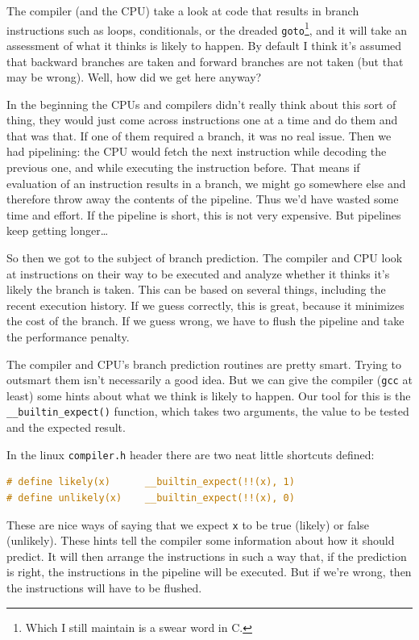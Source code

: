 \documentclass[a4paper]{report}
\begin{document}
The compiler (and the CPU) take a look at code that results in branch instructions  such as loops, conditionals, or the dreaded \texttt{goto}\footnote{Which I still maintain is a swear word in C.}, and it will take an assessment of what it thinks is likely to happen. By default I think it's assumed that backward branches are taken and forward branches are not taken (but that may be wrong).  Well, how did we get here anyway?

In the beginning the CPUs and compilers didn't really think about this sort of thing, they would just come across instructions one at a time and do them and that was that. If one of them required a branch, it was no real issue. Then we had pipelining: the CPU would fetch the next instruction while decoding the previous one, and while executing the instruction before. That means if evaluation of an instruction results in a branch, we might go somewhere else and therefore throw away the contents of the pipeline. Thus we'd have wasted some time and effort. If the pipeline is short, this is not very expensive. But pipelines keep getting longer\ldots

So then we got to the subject of branch prediction. The compiler and CPU look at instructions on their way to be executed and analyze whether it thinks it's likely the branch is taken. This can be based on several things, including the recent execution history. If we guess correctly, this is great, because it minimizes the cost of the branch. If we guess wrong, we have to flush the pipeline and take the performance penalty.

The compiler and CPU's branch prediction routines are pretty smart. Trying to outsmart them isn't necessarily a good idea. But we can give the compiler (\texttt{gcc} at least) some hints about what we think is likely to happen. Our tool for this is the \texttt{\_\_builtin\_expect()} function, which takes two arguments, the value to be tested and the expected result.

In the linux \texttt{compiler.h} header there are two neat little shortcuts defined:

\begin{lstlisting}[language=C]
# define likely(x)      __builtin_expect(!!(x), 1)
# define unlikely(x)    __builtin_expect(!!(x), 0)
\end{lstlisting}

These are nice ways of saying that we expect \texttt{x} to be true (likely) or false (unlikely). These hints tell the compiler some information about how it should predict. It will then arrange the instructions in such a way that, if the prediction is right, the instructions in the pipeline will be executed. But if we're wrong, then the instructions will have to be flushed.
\end{document}
